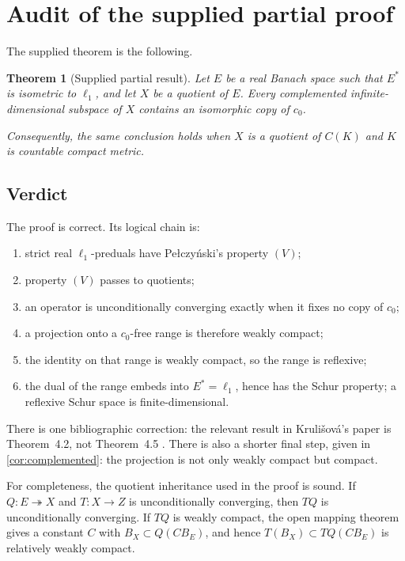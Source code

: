 \documentclass[11pt]{article}
\newtheorem{theorem}{Theorem}[section]
\theoremstyle{definition}
\newcommand{\onto}{\twoheadrightarrow}
\begin{document}
\section{Audit of the supplied partial proof}

The supplied theorem is the following.

\begin{theorem}[Supplied partial result]\label{thm:supplied}
Let $E$ be a real Banach space such that $E^*$ is isometric to $\ell_1$, and
let $X$ be a quotient of $E$.  Every complemented infinite-dimensional
subspace of $X$ contains an isomorphic copy of $c_0$.

Consequently, the same conclusion holds when $X$ is a quotient of $C(K)$ and
$K$ is countable compact metric.
\end{theorem}

\subsection*{Verdict}
The proof is correct.  Its logical chain is:
\begin{enumerate}
\item strict real $\ell_1$-preduals have Pe\l czy\'nski's property $(V)$;
\item property $(V)$ passes to quotients;
\item an operator is unconditionally converging exactly when it fixes no copy
      of $c_0$;
\item a projection onto a $c_0$-free range is therefore weakly compact;
\item the identity on that range is weakly compact, so the range is reflexive;
\item the dual of the range embeds into $E^*=\ell_1$, hence has the Schur
      property; a reflexive Schur space is finite-dimensional.
\end{enumerate}

There is one bibliographic correction: the relevant result in
Kruli\v{s}ov\'a's paper is Theorem~4.2, not Theorem~4.5
\cite[Theorem~4.2]{Krulisova2015}.  There is also a shorter final step, given
in \cref{cor:complemented}: the projection is not only weakly compact but
compact.

For completeness, the quotient inheritance used in the proof is sound.  If
$Q:E\onto X$ and $T:X\to Z$ is unconditionally converging, then $TQ$ is
unconditionally converging.  If $TQ$ is weakly compact, the open mapping
theorem gives a constant $C$ with $B_X\subset Q(CB_E)$, and hence
$T(B_X)\subset TQ(CB_E)$ is relatively weakly compact.
\end{document}
